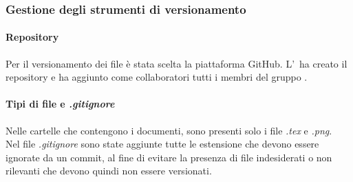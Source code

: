     \subsubsection{Gestione degli strumenti di versionamento}
      \paragraph{Repository}
        Per il versionamento dei file è stata scelta la piattaforma GitHub. L'\roleAdministrator\ ha creato il repository e ha aggiunto 
        come collaboratori tutti i membri del gruppo \groupName.

      \paragraph{Tipi di file e \textit{.gitignore}}
        Nelle cartelle che contengono i documenti, sono presenti solo i file \textit{.tex} e \textit{.png}.\\
        Nel file \textit{.gitignore} sono state aggiunte tutte le estensione che devono essere ignorate da un commit, al fine di evitare la presenza di file indesiderati 
        o non rilevanti che devono quindi non essere versionati.